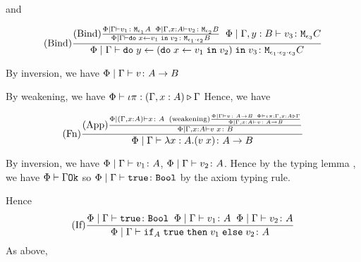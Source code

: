 {        and 

        \begin{equation}
            (\text{Bind}) \frac{
                (\text{Bind}) \frac{
                    \Phi\mid\Gamma \vdash v_1 \colon \texttt{M}_{\epsilon_1}{A}
                    \;\;
                    \Phi\mid\Gamma, x: A \vdash v_2 \colon \texttt{M}_{\epsilon_2}{B}
                }{
                    \Phi\mid\Gamma \vdash \texttt{do}\; x \leftarrow v_1 \;\texttt{in}\; v_2 \colon \texttt{M}_{\epsilon_1\cdot\epsilon_2}{B}
                }
                \;\;
                \Phi\mid\Gamma, y: B \vdash v_3 \colon \texttt{M}_{\epsilon_3}{C}
            }{
                \Phi\mid\Gamma \vdash \texttt{do}\; y \leftarrow (\texttt{do}\; x \leftarrow v_1 \;\texttt{in}\; v_2) \;\texttt{in}\; v_3 \colon \texttt{M}_{\epsilon_1\cdot\epsilon_2\cdot\epsilon_3}{C}
            }
        \end{equation}

        By inversion, we have $\Phi\mid\Gamma \vdash v \colon A\rightarrow B$

        By weakening, we have $\Phi\vdash \iota\pi : (\Gamma, x: A) \triangleright \Gamma$
        Hence, we have

        \begin{equation}
            (\text{Fn}) \frac{
                (\text{App}) \frac{
                    \Phi\mid(\Gamma, x: A) \vdash x \colon A
                    \;\;
                    (\text{weakening}) \frac{
                        \Phi\mid\Gamma \vdash v \colon A\rightarrow B
                        \;\;
                        \Phi\vdash \iota\pi : \Gamma, x: A \triangleright \Gamma
                    }{
                        \Phi\mid\Gamma, x: A \vdash v \colon A\rightarrow B
                    }
                }{
                    \Phi\mid\Gamma, x: A \vdash v\; x \colon B
                }
            }{\Phi\mid\Gamma \vdash \lambda x : A. (v\; x) \colon A\rightarrow B}
        \end{equation}

            By inversion, we have $\Phi\mid\Gamma \vdash v_1 \colon A$, $\Phi\mid\Gamma \vdash v_2 \colon A$. Hence by the typing lemma , we have $\Phi\vdash \Gamma \texttt{Ok}$ so $\Phi\mid\Gamma \vdash \texttt{true} \colon \texttt{Bool}$ by the axiom typing rule.

            Hence 
            \begin{equation}
                    (\text{If}) \frac{
                        \Phi\mid\Gamma \vdash \texttt{true} \colon \texttt{Bool}
                        \;\;
                        \Phi\mid\Gamma \vdash v_1 \colon A
                        \;\;
                        \Phi\mid\Gamma \vdash v_2 \colon A
                    }{
                        \Phi\mid\Gamma \vdash \texttt{if}_{A}\;\texttt{true}\; \texttt{then}\; v_1 \;\texttt{else} \; v_2 \colon A
                    }
            \end{equation}
        As above,

}
